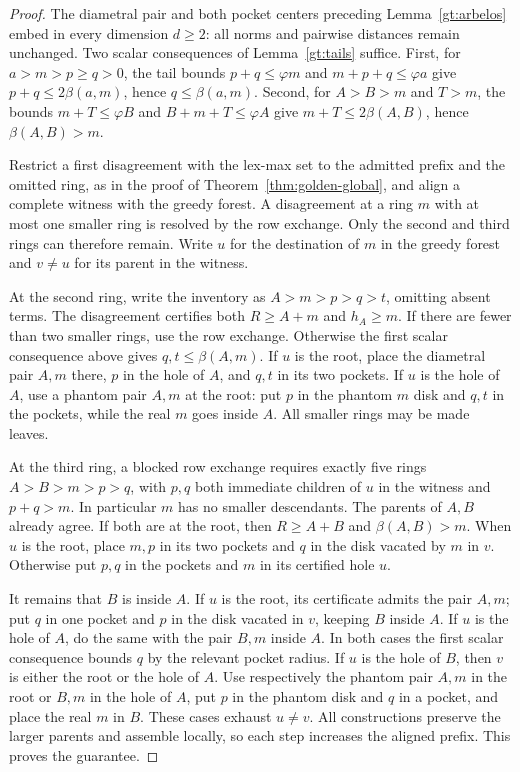 \begin{proof}
The diametral pair and both pocket centers preceding
Lemma~\ref{gt:arbelos} embed in every dimension $d\ge2$: all norms
and pairwise distances remain unchanged. Two scalar consequences of
Lemma~\ref{gt:tails} suffice. First, for $a>m>p\ge q>0$, the tail
bounds $p+q\le\varphi m$ and $m+p+q\le\varphi a$ give
$p+q\le2\beta(a,m)$, hence $q\le\beta(a,m)$. Second, for
$A>B>m$ and $T>m$, the bounds $m+T\le\varphi B$ and
$B+m+T\le\varphi A$ give $m+T\le2\beta(A,B)$, hence
$\beta(A,B)>m$.

Restrict a first disagreement with the lex-max set to the admitted
prefix and the omitted ring, as in the proof of
Theorem~\ref{thm:golden-global}, and align a complete witness with the
greedy forest. A disagreement at a ring $m$ with at most one smaller
ring is resolved by the row exchange. Only the second and third rings
can therefore remain. Write $u$ for the destination of $m$ in the
greedy forest and $v\ne u$ for its parent in the witness.

At the second ring, write the inventory as $A>m>p>q>t$, omitting
absent terms. The disagreement certifies both $R\ge A+m$ and
$h_A\ge m$. If there are fewer than two smaller rings, use the row
exchange. Otherwise the first scalar consequence above gives
$q,t\le\beta(A,m)$. If $u$ is the root, place the diametral pair
$A,m$ there, $p$ in the hole of $A$, and $q,t$ in its two pockets.
If $u$ is the hole of $A$, use a phantom pair $A,m$ at the root:
put $p$ in the phantom $m$ disk and $q,t$ in the pockets, while the
real $m$ goes inside $A$. All smaller rings may be made leaves.

At the third ring, a blocked row exchange requires exactly five
rings $A>B>m>p>q$, with $p,q$ both immediate children of $u$ in
the witness and $p+q>m$. In particular $m$ has no smaller descendants.
The parents of $A,B$ already agree. If both are at the root, then
$R\ge A+B$ and $\beta(A,B)>m$. When $u$ is the root, place $m,p$
in its two pockets and $q$ in the disk vacated by $m$ in $v$.
Otherwise put $p,q$ in the pockets and $m$ in its certified hole $u$.

It remains that $B$ is inside $A$. If $u$ is the root, its certificate
admits the pair $A,m$; put $q$ in one pocket and $p$ in the disk
vacated in $v$, keeping $B$ inside $A$. If $u$ is the hole of $A$,
do the same with the pair $B,m$ inside $A$. In both cases the first
scalar consequence bounds $q$ by the relevant pocket radius.
If $u$ is the hole of $B$, then $v$ is either the root or the hole
of $A$. Use respectively the phantom pair $A,m$ in the root or
$B,m$ in the hole of $A$, put $p$ in the phantom disk and $q$ in
a pocket, and place the real $m$ in $B$. These cases exhaust $u\ne v$.
All constructions preserve the larger parents and assemble locally,
so each step increases the aligned prefix. This proves the guarantee.


\end{proof}
